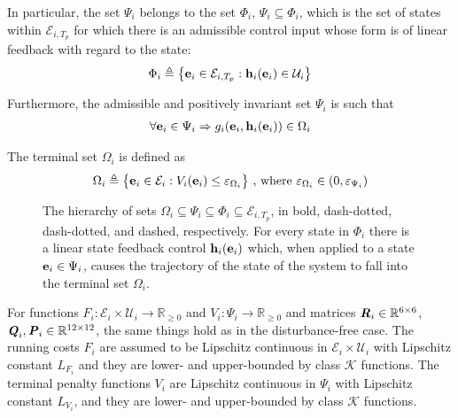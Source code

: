 In particular, the set $\Psi_i$ belongs to the set
$\Phi_i$, $\Psi_i \subseteq \Phi_i$, which is the set of states within
$\mathcal{E}_{i,T_p}$ for which there is an admissible control input whose form
is of linear feedback with regard to the state:
\begin{align}
  \Phi_i \triangleq \big\{\bm{\mathbf{e}}_i \in \mathcal{E}_{i,T_p} : \bm{\mathbf{h}}_i(\bm{\mathbf{e}}_i) \in \mathcal{U}_i \big\}
\end{align}

Furthermore, the admissible and positively invariant set $\Psi_i$ is such that
\begin{align}
\forall \bm{\mathbf{e}}_i \in \Psi_i \Rightarrow g_i(\bm{\mathbf{e}}_i, \bm{\mathbf{h}}_i(\bm{\mathbf{e}}_i)) \in \Omega_i
\end{align}

The terminal set $\Omega_i$ is defined as
\begin{align}
  \Omega_i \triangleq \big\{\bm{\mathbf{e}}_i \in \mathcal{E}_i : V_i(\bm{\mathbf{e}}_i)
    \leq \varepsilon_{\Omega_i}\big\}\ \text{, where } \varepsilon_{\Omega_i} \in (0, \varepsilon_{\Psi_i})
\end{align}


\begin{figure}[ht!]
  \centering
  
  \caption{The hierarchy of sets
  $\Omega_i \subseteq \Psi_i \subseteq \Phi_i \subseteq \mathcal{E}_{i,T_p}$,
  in bold, dash-dotted, dash-dotted, and dashed, respectively.
  For every state in $\Phi_i$ there is a linear state feedback control
  $\bm{\mathbf{h}}_i(\bm{\mathbf{e}}_i)$ which, when applied to a state
  $\bm{\mathbf{e}}_i \in \Psi_i$, causes the trajectory of the state of the system to
  fall into the terminal set $\Omega_i$.}
\end{figure}


For functions
$F_i : \mathcal{E}_i \times \mathcal{U}_i \to \mathbb{R}_{\geq 0}$ and
$V_i: \Psi_i \to \mathbb{R}_{\geq 0}$ and matrices
$\bm{\mathit{R}}_i \in \mathbb{R}^{6 \times 6}$,
$\bm{\mathit{Q}}_i, \bm{\mathit{P}}_i \in \mathbb{R}^{12 \times 12}$, the same things hold
as in the disturbance-free case. The running costs $F_i$ are assumed to be
Lipschitz continuous in $\mathcal{E}_i \times \mathcal{U}_i$ with Lipschitz
constant $L_{F_i}$ and they are lower- and upper-bounded by class $\mathcal{K}$
functions. The terminal penalty functions $V_i$ are Lipschitz continuous in
$\Psi_i$ with Lipschitz constant $L_{V_i}$, and they are
lower- and upper-bounded by class $\mathcal{K}$ functions.


